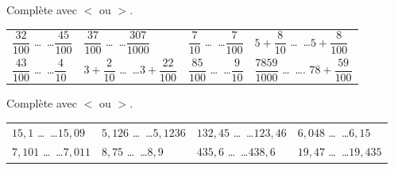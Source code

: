 \documentclass[a4paper,10pt]{report}
\begin{document}
\begin{ex}
Complète avec $<$ ou $>$.
\begin{enumerate}
\begin{tabular}{m{3.5cm}m{4cm}m{3.5cm}m{4cm}}	
\item $\dfrac{32}{100}$ \dots ~\dots $\dfrac{45}{100}$ &
\item $\dfrac{37}{100}$ \dots ~\dots $\dfrac{307}{1000}$ &
\item $\dfrac{7}{10}$ \dots ~\dots $\dfrac{7}{100}$ &
\item $5+\dfrac{8}{10}$ \dots ~\dots $5+\dfrac{8}{100}$\\
\item $\dfrac{43}{100}$ \dots ~\dots $\dfrac{4}{10}$ & 
\item $3+\dfrac{2}{10}$ \dots ~\dots $3+\dfrac{22}{100}$ &
\item $\dfrac{85}{100}$ \dots ~\dots $\dfrac{9}{10}$&
\item $\dfrac{7859}{1000}$ \dots ~\dots. $78+\dfrac{59}{100}$\\
\end{tabular}
\end{enumerate}
\end{ex}

\begin{ex}
Complète avec $<$ ou $>$.
\begin{enumerate}
\begin{tabular}{m{3.5cm}m{4cm}m{3.5cm}m{4cm}}	
\item $15,1$ \dots ~\dots $15,09$ &
\item $5,126$ \dots ~\dots $5,1236$ &
\item $132,45$ \dots ~\dots $123,46$ &
\item $6,048$ \dots ~\dots $6,15$ \\
\item $7,101$ \dots ~\dots $7,011$ &
\item $8,75$ \dots ~\dots $8,9$ &
\item $435,6$ \dots ~\dots $438,6$ &
\item $19,47$ \dots ~\dots $19,435$ \\
\end{tabular}
\end{enumerate}
\end{ex}
\end{document}
